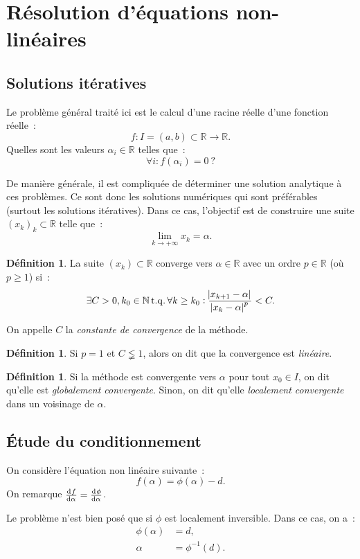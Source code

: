 \documentclass{article}
\theoremstyle{definition}
\newtheorem{déf}[thm]{Définition}
\theoremstyle{remark}
\DeclareMathOperator{\tq}{t.q.}  %
\newcommand{\N}{\mathbb N}
\newcommand{\R}{\mathbb R}
\begin{document}
\newpage
\section{Résolution d'équations non-linéaires}
	\subsection{Solutions itératives}
		Le problème général traité ici est le calcul d'une racine réelle d'une fonction réelle~:
		\[f : I = (a, b) \subset \R \to \R.\]
		Quelles sont les valeurs $\alpha_i \in \R$ telles que~:
		\[\forall i : f(\alpha_i) = 0~?\]

		De manière générale, il est compliquée de déterminer une solution analytique à ces problèmes. Ce sont donc les solutions numériques qui sont préférables
		(surtout les solutions itératives). Dans ce cas, l'objectif est de construire une suite $(x_k)_k \subset \R$ telle que~:
		\[\lim_{k \to +\infty}x_k = \alpha.\]

		\begin{déf} La suite $(x_k) \subset \R$ converge vers $\alpha \in \R$ avec un ordre $p \in \R$ (où $p \geq 1$) si~:
		\[\exists C > 0, k_0 \in \N \tq \forall k \geq k_0 : \frac {\abs {x_{k+1} - \alpha}}{\abs {x_k - \alpha}^p} < C.\]

		On appelle $C$ la \emph{constante de convergence} de la méthode.
		\end{déf}

		\begin{déf} Si $p = 1$ et $C \lneqq 1$, alors on dit que la convergence est \emph{linéaire}.
		\end{déf}

		\begin{déf} Si la méthode est convergente vers $\alpha$ pour tout $x_0 \in I$, on dit qu'elle est \emph{globalement convergente}. Sinon, on dit qu'elle
		\emph{localement convergente} dans un voisinage de $\alpha$.
		\end{déf}

	\subsection{Étude du conditionnement}
		On considère l'équation non linéaire suivante~:
		\[f(\alpha) = \phi(\alpha) - d.\]
		On remarque $\od f\alpha = \od \phi\alpha$.

		Le problème n'est bien posé que si $\phi$ est localement inversible. Dans ce cas, on a~:
		\begin{align*}
			\phi(\alpha) &= d, \\
			\alpha &= \phi^{-1}(d).
		\end{align*}
\end{document}
